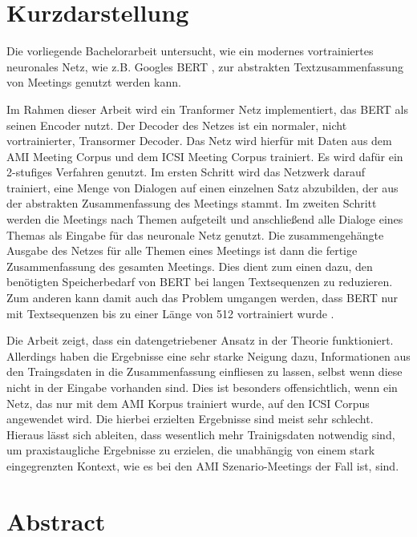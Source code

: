 \thispagestyle{empty}
\section*{Kurzdarstellung}
\label{sec:kurzdarstellung}

Die vorliegende Bachelorarbeit untersucht, wie ein modernes vortrainiertes neuronales Netz, wie z.B. Googles BERT \cite{devlin2018bert}, zur abstrakten Textzusammenfassung von Meetings genutzt werden kann.

Im Rahmen dieser Arbeit wird ein Tranformer Netz \cite{1706.03762} implementiert, das BERT als seinen Encoder nutzt.
Der Decoder des Netzes ist ein normaler, nicht vortrainierter, Transormer Decoder.
Das Netz wird hierfür mit Daten aus dem AMI Meeting Corpus \cite{Mccowan05theami} und dem ICSI Meeting Corpus \cite{Janin} trainiert.
Es wird dafür ein 2-stufiges Verfahren genutzt.
Im ersten Schritt wird das Netzwerk darauf trainiert, eine Menge von Dialogen auf einen einzelnen Satz abzubilden, der aus der abstrakten Zusammenfassung des Meetings stammt.
Im zweiten Schritt werden die Meetings nach Themen aufgeteilt und anschließend alle Dialoge eines Themas als Eingabe für das neuronale Netz genutzt.
Die zusammengehängte Ausgabe des Netzes für alle Themen eines Meetings ist dann die fertige Zusammenfassung des gesamten Meetings.
Dies dient zum einen dazu, den benötigten Speicherbedarf von BERT bei langen Textsequenzen zu reduzieren.
Zum anderen kann damit auch das Problem umgangen werden, dass BERT nur mit Textsequenzen bis zu einer Länge von 512 vortrainiert wurde \cite[p.~13]{devlin2018bert}.

Die Arbeit zeigt, dass ein datengetriebener Ansatz in der Theorie funktioniert.
Allerdings haben die Ergebnisse eine sehr starke Neigung dazu, Informationen aus den Traingsdaten in die Zusammenfassung einfliesen zu lassen, selbst wenn diese nicht in der Eingabe vorhanden sind.
Dies ist besonders offensichtlich, wenn ein Netz, das nur mit dem AMI Korpus trainiert wurde, auf den ICSI Corpus angewendet wird.
Die hierbei erzielten Ergebnisse sind meist sehr schlecht.
Hieraus lässt sich ableiten, dass wesentlich mehr Trainigsdaten notwendig sind, um praxistaugliche Ergebnisse zu erzielen, die unabhängig von einem stark eingegrenzten Kontext, wie es bei den AMI Szenario-Meetings der Fall ist, sind.


\section*{Abstract}
\label{sec:abstract}

